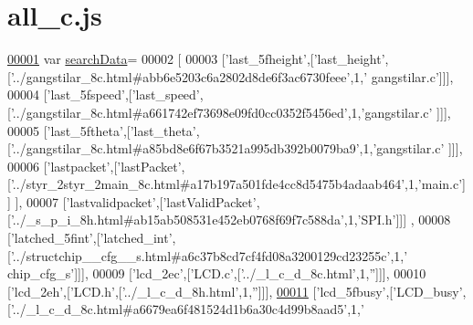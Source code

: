 \hypertarget{all__c_8js_source}{}\section{all\+\_\+c.\+js}
\label{all__c_8js_source}

\begin{DoxyCode}
\hypertarget{all__c_8js_source.tex_l00001}{}\hyperlink{all__c_8js_ad01a7523f103d6242ef9b0451861231e}{00001} var \hyperlink{all__c_8js_ad01a7523f103d6242ef9b0451861231e}{searchData}=
00002 [
00003   [\textcolor{stringliteral}{'last\_5fheight'},[\textcolor{stringliteral}{'last\_height'},[\textcolor{stringliteral}{'../gangstilar\_8c.html#abb6e5203c6a2802d8de6f3ac6730feee'},1,\textcolor{stringliteral}{'
      gangstilar.c'}]]],
00004   [\textcolor{stringliteral}{'last\_5fspeed'},[\textcolor{stringliteral}{'last\_speed'},[\textcolor{stringliteral}{'../gangstilar\_8c.html#a661742ef73698e09fd0cc0352f5456ed'},1,\textcolor{stringliteral}{'gangstilar.c'}
      ]]],
00005   [\textcolor{stringliteral}{'last\_5ftheta'},[\textcolor{stringliteral}{'last\_theta'},[\textcolor{stringliteral}{'../gangstilar\_8c.html#a85bd8e6f67b3521a995db392b0079ba9'},1,\textcolor{stringliteral}{'gangstilar.c'}
      ]]],
00006   [\textcolor{stringliteral}{'lastpacket'},[\textcolor{stringliteral}{'lastPacket'},[\textcolor{stringliteral}{'../styr\_2styr\_2main\_8c.html#a17b197a501fde4cc8d5475b4adaab464'},1,\textcolor{stringliteral}{'main.c'}]]
      ],
00007   [\textcolor{stringliteral}{'lastvalidpacket'},[\textcolor{stringliteral}{'lastValidPacket'},[\textcolor{stringliteral}{'../\_s\_p\_i\_8h.html#ab15ab508531e452eb0768f69f7c588da'},1,\textcolor{stringliteral}{'SPI.h'}]]]
      ,
00008   [\textcolor{stringliteral}{'latched\_5fint'},[\textcolor{stringliteral}{'latched\_int'},[\textcolor{stringliteral}{'../structchip\_\_cfg\_\_s.html#a6c37b8cd7cf4fd08a3200129cd23255c'},1,\textcolor{stringliteral}{'
      chip\_cfg\_s'}]]],
00009   [\textcolor{stringliteral}{'lcd\_2ec'},[\textcolor{stringliteral}{'LCD.c'},[\textcolor{stringliteral}{'../\_l\_c\_d\_8c.html'},1,\textcolor{stringliteral}{''}]]],
00010   [\textcolor{stringliteral}{'lcd\_2eh'},[\textcolor{stringliteral}{'LCD.h'},[\textcolor{stringliteral}{'../\_l\_c\_d\_8h.html'},1,\textcolor{stringliteral}{''}]]],
\hypertarget{all__c_8js_source.tex_l00011}{}\hyperlink{all__c_8js_ad3f96ba0215f3c7b9ae0f780c5ecb61a}{00011}   [\textcolor{stringliteral}{'lcd\_5fbusy'},[\textcolor{stringliteral}{'LCD\_busy'},[\textcolor{stringliteral}{'../\_l\_c\_d\_8c.html#a6679ea6f481524d1b6a30c4d99b8aad5'},1,\textcolor{stringliteral}{'
}
\end{DoxyCode}

